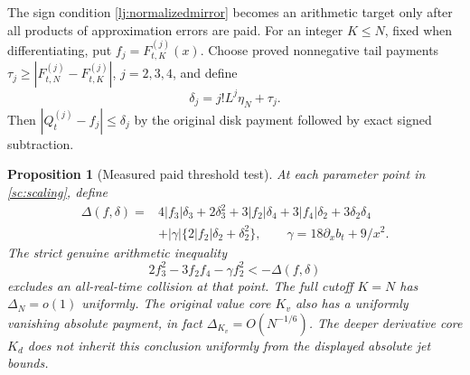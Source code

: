 \documentclass[11pt]{article}
\numberwithin{equation}{section}
\newtheorem{proposition}[theorem]{Proposition}
\theoremstyle{definition}
\theoremstyle{remark}
\begin{document}
The sign condition \eqref{lj:normalizedmirror} becomes an arithmetic
target only after all products of approximation errors are paid.
For an integer \(K\le N\), fixed when differentiating, put
\(f_j=F_{t,K}^{(j)}(x)\). Choose proved nonnegative tail payments
\(\tau_j\ge|F_{t,N}^{(j)}-F_{t,K}^{(j)}|\), \(j=2,3,4\), and define
\begin{equation}\label{lj:jeterrors}
 \delta_j=j!L^j\eta_N+\tau_j.
\end{equation}
Then \(|Q_t^{(j)}-f_j|\le\delta_j\) by the original disk payment
followed by exact signed subtraction.

\begin{proposition}[Measured paid threshold test]\label{lj:paidtest}
At each parameter point in \eqref{sc:scaling}, define
\begin{align}
 \Delta(f,\delta)={}&4|f_3|\delta_3+2\delta_3^2
       +3|f_2|\delta_4+3|f_4|\delta_2+3\delta_2\delta_4\nonumber\\
       &+|\gamma|\{2|f_2|\delta_2+\delta_2^2\},
       \qquad \gamma=18\partial_xb_t+9/x^2.
       \label{lj:measuredpayment}
\end{align}
The strict genuine arithmetic inequality
\begin{equation}\label{lj:negativetest}
 2f_3^2-3f_2f_4-\gamma f_2^2<-\Delta(f,\delta)
\end{equation}
excludes an all-real-time collision at that point.
The full cutoff \(K=N\) has \(\Delta_N=o(1)\) uniformly.
The original value core \(K_v\) also has a uniformly vanishing absolute
payment, in fact
\(\Delta_{K_v}=O(N^{-1/6})\). The deeper derivative core \(K_d\)
does not inherit this conclusion uniformly from the displayed absolute
jet bounds.
\end{proposition}
\end{document}
